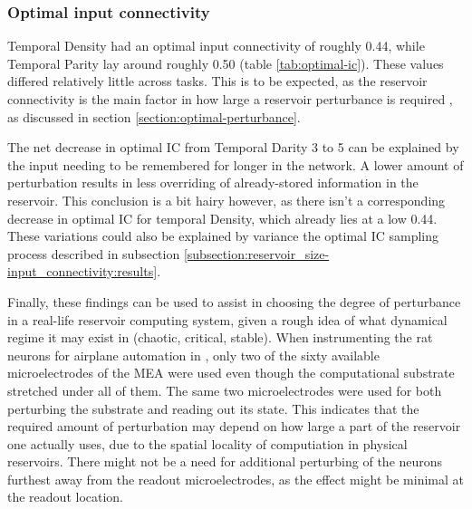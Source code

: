 \subsubsection{Optimal input connectivity}

Temporal Density had an optimal input connectivity of roughly 0.44, while Temporal Parity lay around roughly 0.50 (table \ref{tab:optimal-ic}).
These values differed relatively little across tasks.
This is to be expected, as the reservoir connectivity is the main factor in how large a reservoir perturbance is required \cite{rbn-reservoir},
as discussed in section \ref{section:optimal-perturbance}.

The net decrease in optimal IC from Temporal Darity 3 to 5 can be explained by the input needing to be remembered for longer in the network.
A lower amount of perturbation results in less overriding of already-stored information in the reservoir.
This conclusion is a bit hairy however,
as there isn't a corresponding decrease in optimal IC for temporal Density, which already lies at a low 0.44.
These variations could also be explained by variance the optimal IC sampling process described in subsection \ref{subsection:reservoir_size-input_connectivity:results}.

Finally, these findings can be used to assist in choosing the degree of perturbance in a real-life reservoir computing system,
given a rough idea of what dynamical regime it may exist in (chaotic, critical, stable).
When instrumenting the rat neurons for airplane automation in \cite{demarse2005adaptive},
only two of the sixty available microelectrodes of the MEA were used even though the computational substrate stretched under all of them.
The same two microelectrodes were used for both perturbing the substrate and reading out its state.
This indicates that the required amount of perturbation may depend on how large a part of the reservoir one actually uses,
due to the spatial locality of computiation in physical reservoirs.
There might not be a need for additional perturbing of the neurons furthest away from the readout microelectrodes,
as the effect might be minimal at the readout location.
